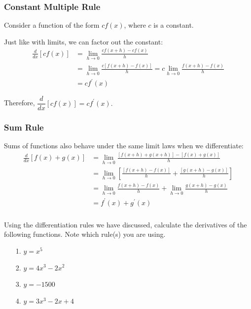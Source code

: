 \documentclass[14pt]{beamer}
\begin{document}
\begin{frame}
\frametitle{Constant Multiple Rule}
\small
Consider a function of the form $cf(x)$, where $c$ is a constant.

Just like with limits, we can factor out the constant: 
\begin{align*}
\frac{d}{dx}[cf(x)] &= \lim_{h \to 0} \frac{cf(x+h)-cf(x)}{h} \\
&= \lim_{h \to 0} \frac{c[f(x+h)-f(x)]}{h} = c\lim_{h \to 0} \frac{f(x+h)-f(x)}{h} \\[0.25pc]
&= cf^{\prime}(x)
\end{align*}

Therefore, $\dfrac{d}{dx}[cf(x)]=cf^{\prime}(x).$
\end{frame}

\begin{frame}
\frametitle{Sum Rule}
\small
Sums of functions also behave under the same limit laws when we differentiate:
\begin{align*}
\frac{d}{dx}[f(x)+g(x)] &= \lim_{h \to 0} \frac{[f(x+h)+g(x+h)]-[f(x)+g(x)]}{h} \\
&= \lim_{h \to 0} \left[\frac{[f(x+h)-f(x)]}{h}+\frac{[g(x+h)-g(x)]}{h}\right] \\[0.25pc]
&= \lim_{h \to 0} \frac{f(x+h)-f(x)}{h}+ \lim_{h \to 0}\frac{g(x+h)-g(x)}{h} \\[0.25pc]
&= f^{\prime}(x)+g^{\prime}(x)
\end{align*}
\end{frame}


\begin{frame}
\frametitle{}
\begin{ex}Using the differentiation rules we have discussed, calculate the derivatives of the following functions.  Note which rule(s) you are using.
\begin{itemize}
\item[1.] $y=x^5$
\item[2.] $y=4x^3-2x^2$
\item[3.] $y=-1500$
\item[4.] $y=3x^3-2x+4$
\end{itemize}
\end{ex}
\end{frame}
\end{document}
